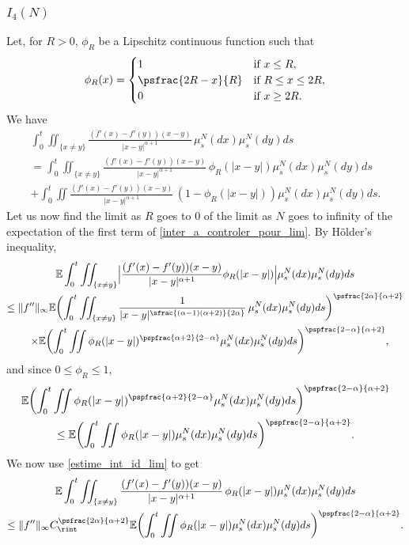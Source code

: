 \subsubsection*{$I_4(N)$} Let, for $R>0$, $\phi_R$ be a Lipschitz continuous function such that
\begin{align*}
\phi_R(x)=\begin{cases}
1&\text{if }x\leq R,\\\psfrac{2R-x}{R}&\text{if }R\leq x\leq 2R,\\
0&\text{if }x\geq 2R. \end{cases}
\end{align*}
We have
\begin{multline}\label{inter_a_controler_pour_lim}
\int_{0}^t\iint_{\{x\neq y\}}\frac{(f'(x)-f'(y))(x-y)}{|x-y|^{\alpha+1}}\,\mu^N_s(dx)\mu^N_s(dy)ds\\
=\int_{0}^t\iint_{\{x\neq y\}}\frac{(f'(x)-f'(y))(x-y)}{|x-y|^{\alpha+1}}\,\phi_R(|x-y|)\mu^N_s(dx)\mu^N_s(dy)ds\\
+\int_{0}^t\iint\frac{(f'(x)-f'(y))(x-y)}{|x-y|^{\alpha+1}}\,(1-\phi_R(|x-y|))\mu^N_s(dx)\mu^N_s(dy)ds.
\end{multline}
Let us now find the limit as $R$ goes to 0 of the limit as $N$ goes to infinity of the expectation of the first term of \eqref{inter_a_controler_pour_lim}. By Hölder's inequality,
\begin{multline*}
\mathbb{E}\int_{0}^t\iint_{\{x\neq y\}}\Bigl|\frac{(f'(x)-f'(y))(x-y)}{|x-y|^{\alpha+1}}\phi_R(|x-y|)\Bigr|\mu^N_s(dx)\mu^N_s(dy)ds\\
\leq \|f''\|_\infty\mathbb{E}\biggl(\int_{0}^t\iint_{\{x\neq y\}}\frac{1}{|x-y|^{\sfrac{(\alpha-1)(\alpha+2)}{2\alpha}}}\,\mu^N_s(dx)\mu^N_s(dy)ds\biggr)^{\psfrac{2\alpha}{\alpha+2}}\\
\hspace{0.3cm}\times\mathbb{E}\biggl(\int_{0}^t\iint\phi_R(|x-y|)^{\pspfrac{\alpha+2}{2-\alpha}}\mu^N_s(dx)\mu^N_s(dy)ds\biggr)^{\pspfrac{2-\alpha}{\alpha+2}},
\end{multline*}
and since $0\leq\phi_R\leq1$,
\begin{multline*}
\mathbb{E}\biggl(\int_{0}^t\iint\phi_R(|x-y|)^{\pspfrac{\alpha+2}{2-\alpha}}\mu^N_s(dx)\mu^N_s(dy)ds\biggr)^{\pspfrac{2-\alpha}{\alpha+2}}
\\
\leq\mathbb{E}\biggl(\int_{0}^t\iint\phi_R(|x-y|)\mu^N_s(dx)\mu^N_s(dy)ds\biggr)^{\pspfrac{2-\alpha}{\alpha+2}}.
\end{multline*}
We now use \eqref{estime_int_id_lim} to get
\begin{multline}\label{inter_a_controler_pour_lim_1}
\mathbb{E}\int_{0}^t\iint_{\{x\neq y\}}\frac{(f'(x)-f'(y))(x-y)}{|x-y|^{\alpha+1}}\,\phi_R(|x-y|)\mu^N_s(dx)\mu^N_s(dy)ds\\
\leq \|f''\|_\infty C_{\rint}^{\psfrac{2\alpha}{\alpha+2}}\mathbb{E}\biggl(\int_{0}^t\iint\phi_R(|x-y|)\mu^N_s(dx)\mu^N_s(dy)ds\biggr)^{\pspfrac{2-\alpha}{\alpha+2}}.
\end{multline}
